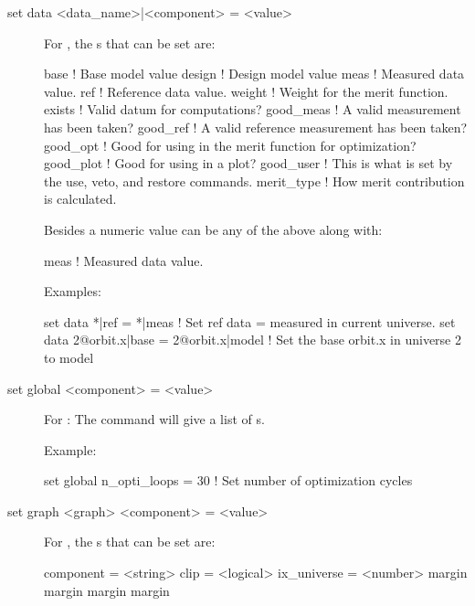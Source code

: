 {{\begin{description}

\item[set data <data\_name>|<component> = <value>] \Newline
For , the s that can be set are:
\begin{example}
  base        ! Base model value
  design      ! Design model value
  meas        ! Measured data value.
  ref         ! Reference data value.
  weight      ! Weight for the merit function.
  exists      ! Valid datum for computations?
  good_meas   ! A valid measurement has been taken?
  good_ref    ! A valid reference measurement has been taken?
  good_opt    ! Good for using in the merit function for optimization?
  good_plot   ! Good for using in a plot?
  good_user   ! This is what is set by the use, veto, and restore commands.
  merit_type  ! How merit contribution is calculated.
\end{example}
Besides a numeric value  can be any of the above along with:
\begin{example}
  meas        ! Measured data value.
\end{example}

Examples:
\begin{example}
  set data *|ref = *|meas       ! Set ref data = measured in current universe.
  set data 2@orbit.x|base = 2@orbit.x|model 
                                ! Set the base orbit.x in universe 2 to model
\end{example}


\item[set global <component> = <value>] \Newline
For : The  command will give a list of 
s.

Example:
\begin{example}
  set global n_opti_loops = 30  ! Set number of optimization cycles
\end{example}


\item[set graph <graph> <component> = <value>] \Newline
For , the s that can be set are:
\begin{example}
  component   = <string>
  clip        = <logical>
  ix_universe = <number>
  margin%
  margin%
  margin%
  margin%
\end{example}


\end{description}}}
